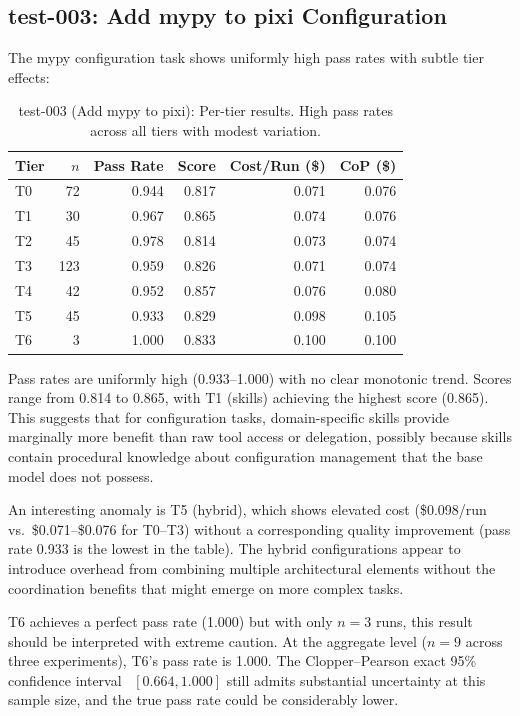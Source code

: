 \documentclass[11pt]{article}
\begin{document}
\subsection{test-003: Add mypy to pixi Configuration}
\label{sec:test003}

The mypy configuration task shows uniformly high pass rates with subtle tier
effects:

\begin{table}[htbp]
  \centering
  \caption{test-003 (Add mypy to pixi): Per-tier results. High pass rates
    across all tiers with modest variation.}
  \label{tab:test003}
  \small
  \begin{tabular}{lrrrrr}
    \toprule
    Tier & $n$ & Pass Rate & Score & Cost/Run (\$) & CoP (\$) \\
    \midrule
    T0 & 72  & 0.944 & 0.817 & 0.071 & 0.076 \\
    T1 & 30  & 0.967 & 0.865 & 0.074 & 0.076 \\
    T2 & 45  & 0.978 & 0.814 & 0.073 & 0.074 \\
    T3 & 123 & 0.959 & 0.826 & 0.071 & 0.074 \\
    T4 & 42  & 0.952 & 0.857 & 0.076 & 0.080 \\
    T5 & 45  & 0.933 & 0.829 & 0.098 & 0.105 \\
    T6 & 3   & 1.000 & 0.833 & 0.100 & 0.100 \\
    \bottomrule
  \end{tabular}
\end{table}

Pass rates are uniformly high (0.933--1.000) with no clear monotonic trend.
Scores range from 0.814 to 0.865, with T1 (skills) achieving the highest
score (0.865). This suggests that for configuration tasks, domain-specific
skills provide marginally more benefit than raw tool access or delegation,
possibly because skills contain procedural knowledge about configuration
management that the base model does not possess.

An interesting anomaly is T5 (hybrid), which shows elevated cost
(\$0.098/run vs.\ \$0.071--\$0.076 for T0--T3) without a corresponding
quality improvement (pass rate 0.933 is the lowest in the table). The hybrid
configurations appear to introduce overhead from combining multiple
architectural elements without the coordination benefits that might emerge
on more complex tasks.

T6 achieves a perfect pass rate (1.000) but with only $n=3$ runs, this
result should be interpreted with extreme caution. At the aggregate level
($n=9$ across three experiments), T6's pass rate is 1.000. The
Clopper--Pearson exact 95\% confidence interval~\cite{clopper1934use}
$[0.664, 1.000]$ still admits substantial uncertainty at this sample size,
and the true pass rate could be considerably lower.
\end{document}
